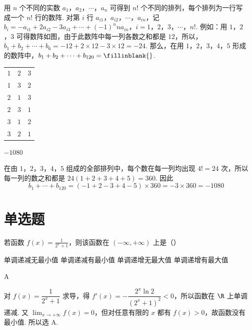 \begin{problem}
用 \(n\) 个不同的实数 \(a_1\)，\(a_2\)，\(\cdots\)，\(a_n\) 可得到 \(n!\) 个不同的排列，每个排列为一行写成一个 \(n!\) 行的数阵. 对第 \(i\) 行 \(a_{i1}\)，\(a_{i2}\)，\(\cdots\)，\(a_{in}\)，记 \(b_i = -a_{i1} + 2a_{i2} - 3a_{i3} + \cdots + (-1)^n na_{in}\)，\(i = 1\)，\(2\)，\(3\)，\(\cdots\)，\(n!\). 例如：用 \(1\)，\(2\)，\(3\) 可得数阵如图，由于此数阵中每一列各数之和都是 \(12\)，所以，\(b_1 + b_2 + \cdots + b_6 = -12 + 2 \times 12 - 3 \times 12 = -24\). 那么，在用 \(1\)，\(2\)，\(3\)，\(4\)，\(5\) 形成的数阵中，\(b_1 + b_2 + \cdots + b_{120} =\fillinblank{}\).

\begin{center}
\begin{tabular}{ccc}
\(1\) & \(2\) & \(3\) \\
\(1\) & \(3\) & \(2\) \\
\(2\) & \(1\) & \(3\) \\
\(2\) & \(3\) & \(1\) \\
\(3\) & \(1\) & \(2\) \\
\(3\) & \(2\) & \(1\)
\end{tabular}
\end{center}
\end{problem}

\begin{answer}
\(-1080\)
\end{answer}

\begin{solution}
在由 \(1\)，\(2\)，\(3\)，\(4\)，\(5\) 组成的全部排列中，每个数在每一列均出现 \(4!=24\) 次，所以每一列的数之和都是 \(24(1+2+3+4+5)=360\). 因此
\[
b_1+\cdots+b_{120}=(-1+2-3+4-5)\times360=-3\times360=-1080
\]
\end{solution}

\section{单选题}
\begin{problem}
若函数 \( f(x) = \frac{1}{2^x + 1} \)，则该函数在 \((- \infty, +\infty)\) 上是（\quad）

\choices
    {单调递减无最小值}
    {单调递减有最小值}
    {单调递增无最大值}
    {单调递增有最大值}
\end{problem}

\begin{answer}
A
\end{answer}

\begin{solution}
对 \(f(x)=\dfrac1{2^x+1}\) 求导，得 \(f'(x)=-\dfrac{2^x\ln2}{(2^x+1)^2}<0\)，所以函数在 \(\R\) 上单调递减. 又 \(\lim_{x\to+\infty}f(x)=0\)，但对任意有限的 \(x\) 都有 \(f(x)>0\)，故函数没有最小值. 所以选 A.
\end{solution}

